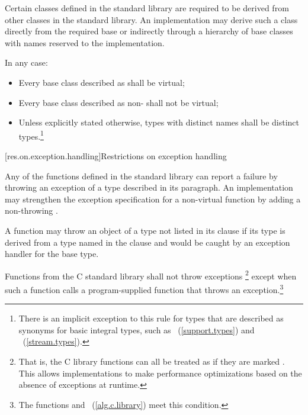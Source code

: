\pnum
Certain classes defined in the \Cpp standard library are required to be derived from
other classes
in the \Cpp standard library.
%
An implementation may derive such a class directly from the required base or indirectly
through a hierarchy of base classes with names reserved to the implementation.

\pnum
In any case:

\begin{itemize}
\item
Every base class described as
shall be virtual;
%
\item
Every base class described as
non-
shall not be virtual;
%
\item
Unless explicitly stated otherwise, types with distinct names shall be distinct
types.\footnote{There is an implicit exception to this rule for types that are
described as synonyms for basic integral types, such as
~(\ref{support.types}) and
~(\ref{stream.types}).}
\end{itemize}

[res.on.exception.handling]{Restrictions on exception handling}%
%

\pnum
Any of the functions defined in the \Cpp standard library
%
can report a failure by throwing an exception of a type described in its
paragraph.
An implementation may strengthen the
exception specification
for a
non-virtual
function by adding a non-throwing .

\pnum
A function may throw an object of a type not listed in its 
clause if its type is derived from a type named in the  clause
and would be caught by an exception handler for the base type.

\pnum
Functions from the C standard library shall not throw exceptions%
\footnote{That is, the C
library functions can all be treated as if they
are marked .
This allows implementations to make performance optimizations
based on the absence of exceptions at runtime.}
except when such a function calls a program-supplied function that throws an
exception.\footnote{The functions
and
~(\ref{alg.c.library}) meet this condition.}

